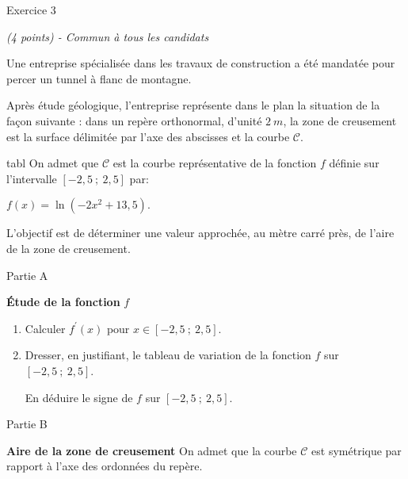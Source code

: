 
%
\begin{h2}Exercice 3\end{h2}
\textit{(4 points) - Commun à tous les candidats}
\par
Une entreprise spécialisée dans les travaux de construction a été mandatée pour percer un tunnel à flanc de montagne.
\par
Après étude géologique, l'entreprise représente dans le plan la situation de la façon suivante : dans un repère orthonormal, d'unité $2~m$, la zone de creusement est la surface délimitée par l'axe des abscisses et la courbe $\mathscr{C}$.

\begin{center}
\end{center}
tabl
On admet que $\mathscr{C}$ est la courbe représentative de la fonction $f$ définie sur l'intervalle $[- 2,5~;~2,5]$ par:
\begin{center}$f(x) = \ln \left(- 2x^2+13,5\right).$\end{center}
L'objectif est de déterminer une valeur approchée, au mètre carré près, de l'aire de la zone de creusement.
\begin{h3}Partie A\end{h3}
\textbf{Étude de la fonction }  $f$
\begin{enumerate}
     \item
     Calculer $f^\prime(x)$ pour $x \in  [- 2,5~;~2,5]$.
     \item
     Dresser, en justifiant, le tableau de variation de la fonction $f$ sur $[- 2,5~;~2,5]$.
     \par
     En déduire le signe de $f$ sur $[- 2,5~;~2,5]$.
\end{enumerate}
\begin{h3}Partie B\end{h3}
\textbf{Aire de la zone de creusement}
On admet que la courbe $\mathscr{C}$ est symétrique par rapport à l'axe des ordonnées du repère.
